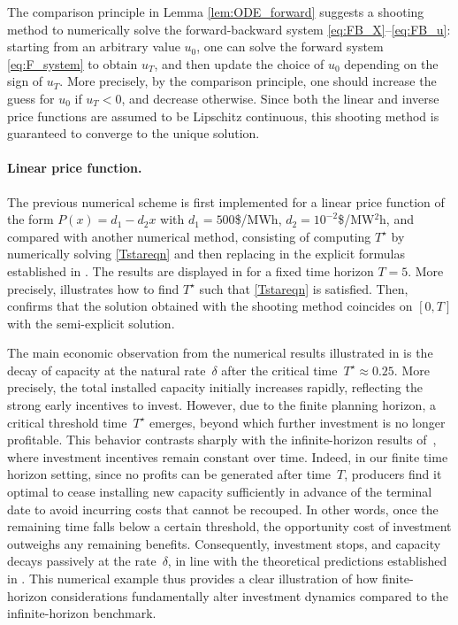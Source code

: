 \documentclass[12pt]{article}
\begin{document}
The comparison principle in Lemma \ref{lem:ODE_forward} suggests a shooting method to numerically solve the forward-backward system \eqref{eq:FB_X}--\eqref{eq:FB_u}: starting from an arbitrary value $u_0$, one can solve the forward system \eqref{eq:F_system} to obtain $u_T$, and then update the choice of $u_0$ depending on the sign of $u_T$. More precisely, by the comparison principle, one should increase the guess for $u_0$ if $u_T<0$, and decrease otherwise. 
Since both the linear and inverse price functions are assumed to be Lipschitz continuous, this shooting method is guaranteed to converge to the unique solution.

\vspace{-1em}

\paragraph{Linear price function.} The previous numerical scheme is first implemented for a linear price function of the form $P(x)=d_1-d_2x$ with $d_1=500$\$/MWh, $d_2=10^{-2}$\$/MW$^2$h, and compared with another numerical method, consisting of computing $T^\star$ by numerically solving \eqref{Tstareqn} and then replacing in the explicit formulas established in . The results are displayed in  for a fixed time horizon $T=5$. More precisely,  illustrates how to find $T^\star$ such that \eqref{Tstareqn} is satisfied. Then,  confirms that the solution obtained with the shooting method coincides on $[0,T]$ with the semi-explicit solution.

The main economic observation from the numerical results illustrated in  is the decay of capacity at the natural rate~$\delta$ after the critical time~$T^\star \approx 0.25$. More precisely, the total installed capacity initially increases rapidly, reflecting the strong early incentives to invest. However, due to the finite planning horizon, a critical threshold time~$T^\star$ emerges, beyond which further investment is no longer profitable. This behavior contrasts sharply with the infinite-horizon results of~\cite{alasseur2023mean}, where investment incentives remain constant over time. Indeed, in our finite time horizon setting, since no profits can be generated after time~$T$, producers find it optimal to cease installing new capacity sufficiently in advance of the terminal date to avoid incurring costs that cannot be recouped. In other words, once the remaining time falls below a certain threshold, the opportunity cost of investment outweighs any remaining benefits. Consequently, investment stops, and capacity decays passively at the rate~$\delta$, in line with the theoretical predictions established in . This numerical example thus provides a clear illustration of how finite-horizon considerations fundamentally alter investment dynamics compared to the infinite-horizon benchmark.
\end{document}
